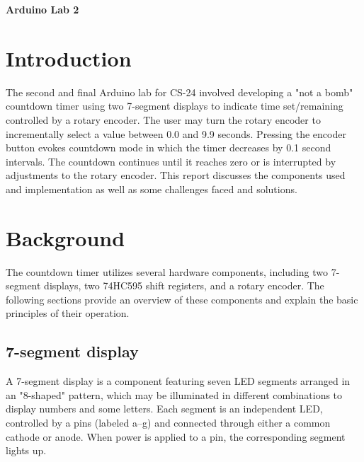 \documentclass[fleqn]{article}
\begin{document}
\pagestyle{fancy}
\fancyhead{}
\fancyhead[R]{\thepage}
\fancyfoot{}


\begin{center}
    \Large{\textbf{Arduino Lab 2}}\\
\end{center}
\vspace{0.25in}

\section*{Introduction}
The second and final Arduino lab for CS-24 involved developing a "not a bomb" countdown timer using two 7-segment displays to indicate time set/remaining controlled by a rotary encoder. The user may turn the rotary encoder to incrementally select a value between 0.0 and 9.9 seconds. Pressing the encoder button evokes countdown mode in which the timer decreases by 0.1 second intervals. The countdown continues until it reaches zero or is interrupted by adjustments to the rotary encoder. This report discusses the components used and implementation as well as some challenges faced and solutions.
\section*{Background}
The countdown timer utilizes several hardware components, including two 7-segment displays, two 74HC595 shift registers, and a rotary encoder. The following sections provide an overview of these components and explain the basic principles of their operation.
\subsection*{7-segment display}
A 7-segment display is a component featuring seven LED segments arranged in an "8-shaped" pattern, which may be illuminated in different combinations to display numbers and some letters. Each segment is an independent LED, controlled by a pins (labeled a–g) and connected through either a common cathode or anode. When power is applied to a pin, the corresponding segment lights up.
\end{document}
